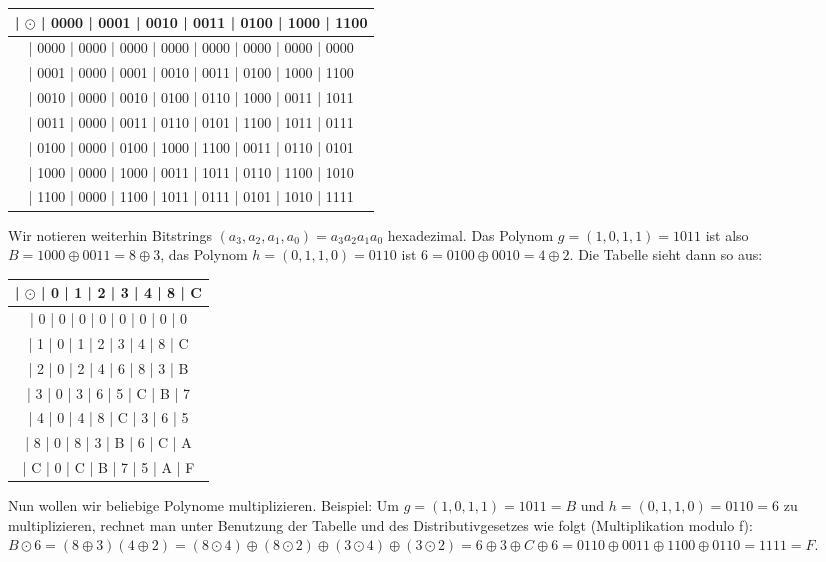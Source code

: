 \documentclass[a4paper]{article}
\begin{document}
\begin{multicols}{3}
    \begin{tabular}{c}
    | $\odot$ | 0000 | 0001 | 0010 | 0011 | 0100 | 1000 | 1100 \\\hline
    | 0000  | 0000 | 0000 | 0000 | 0000 | 0000 | 0000 | 0000 \\
    | 0001  | 0000 | 0001 | 0010 | 0011 | 0100 | 1000 | 1100 \\
    | 0010  | 0000 | 0010 | 0100 | 0110 | 1000 | 0011 | 1011 \\
    | 0011  | 0000 | 0011 | 0110 | 0101 | 1100 | 1011 | 0111 \\
    | 0100  | 0000 | 0100 | 1000 | 1100 | 0011 | 0110 | 0101 \\
    | 1000  | 0000 | 1000 | 0011 | 1011 | 0110 | 1100 | 1010 \\
    | 1100  | 0000 | 1100 | 1011 | 0111 | 0101 | 1010 | 1111 
    \end{tabular}

    Wir notieren weiterhin Bitstrings $(a_3,a_2,a_1,a_0)=a_3a_2a_1a_0$ hexadezimal. Das Polynom $g=(1,0,1,1)=1011$ ist also $B=1000\oplus 0011=8\oplus 3$, das Polynom $h=(0,1,1,0)=0110$ ist $6=0100\oplus 0010=4\oplus 2$.
    Die Tabelle sieht dann so aus:
    \begin{tabular}{c}
    | $\odot$ | 0  | 1  | 2  | 3  | 4  | 8  | C  \\\hline
    | 0    | 0  | 0  | 0  | 0  | 0  | 0  | 0  \\
    | 1    | 0  | 1  | 2  | 3  | 4  | 8  | C  \\
    | 2    | 0  | 2  | 4  | 6  | 8  | 3  | B  \\
    | 3    | 0  | 3  | 6  | 5  | C  | B  | 7  \\
    | 4    | 0  | 4  | 8  | C  | 3  | 6  | 5  \\
    | 8    | 0  | 8  | 3  | B  | 6  | C  | A  \\
    | C    | 0  | C  | B  | 7  | 5  | A  | F  
    \end{tabular}

    Nun wollen wir beliebige Polynome multiplizieren. Beispiel: Um $g=(1,0,1,1)=1011=B$ und $h=(0,1,1,0)=0110=6$ zu multiplizieren, rechnet man unter Benutzung der Tabelle und des Distributivgesetzes wie folgt (Multiplikation modulo f):
    $B\odot 6=(8\oplus 3)(4\oplus 2)=(8\odot 4)\oplus(8\odot 2)\oplus(3\odot 4)\oplus(3\odot 2)=6\oplus 3\oplus C\oplus 6= 0110\oplus 0011 \oplus 1100 \oplus 0110 = 1111 = F$.


\end{multicols}
\end{document}
